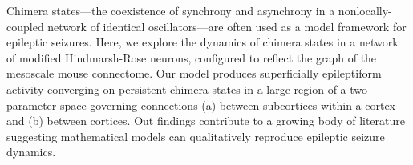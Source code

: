 Chimera states---the coexistence of synchrony and asynchrony in a nonlocally-coupled network of identical oscillators---are often used as a model framework for epileptic seizures.
Here, we explore the dynamics of chimera states in a network of modified Hindmarsh-Rose neurons, configured to reflect the graph of the mesoscale mouse connectome.
Our model produces superficially epileptiform activity converging on persistent chimera states in a large region of a two-parameter space governing connections (a) between subcortices within a cortex and (b) between cortices.
Out findings contribute to a growing body of literature suggesting mathematical models can qualitatively reproduce epileptic seizure dynamics.